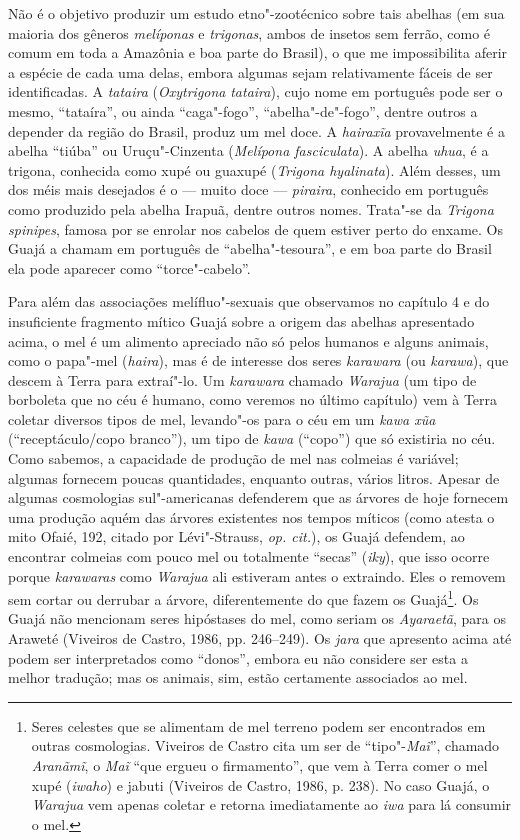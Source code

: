 Não é o objetivo produzir um estudo etno"-zootécnico sobre tais abelhas
(em sua maioria dos gêneros \emph{melíponas} e \emph{trigonas}, ambos de
insetos sem ferrão, como é comum em toda a Amazônia e boa parte do
Brasil), o que me impossibilita aferir a espécie de cada uma delas,
embora algumas sejam relativamente fáceis de ser identificadas. A
\emph{tataira} (\emph{Oxytrigona} \emph{tataira}), cujo nome em
português pode ser o mesmo, ``tataíra'', ou ainda ``caga"-fogo'',
``abelha"-de"-fogo'', dentre outros a depender da região do Brasil, produz
um mel doce. A \emph{hairaxĩa} provavelmente é a abelha ``tiúba'' ou
Uruçu"-Cinzenta (\emph{Melípona fasciculata}). A abelha \emph{uhua}, é a
trigona, conhecida como xupé ou guaxupé (\emph{Trigona hyalinata}). Além
desses, um dos méis mais desejados é o --- muito doce --- \emph{piraira},
conhecido em português como produzido pela abelha Irapuã, dentre outros
nomes. Trata"-se da \emph{Trigona spinipes}, famosa por se enrolar nos
cabelos de quem estiver perto do enxame. Os Guajá a chamam em português
de ``abelha"-tesoura'', e em boa parte do Brasil ela pode aparecer como
``torce"-cabelo''.

Para além das associações melífluo"-sexuais que observamos no capítulo 4
e do insuficiente fragmento mítico Guajá sobre a origem das abelhas
apresentado acima, o mel é um alimento apreciado não só pelos humanos e
alguns animais, como o papa"-mel (\emph{haira}), mas é de interesse dos
seres \emph{karawara} (ou \emph{karawa}), que descem à Terra para
extraí"-lo. Um \emph{karawara} chamado \emph{Warajua} (um tipo de
borboleta que no céu é humano, como veremos no último capítulo) vem à
Terra coletar diversos tipos de mel, levando"-os para o céu em um
\emph{kawa xũa} (``receptáculo/copo branco''), um tipo de \emph{kawa}
(``copo'') que só existiria no céu. Como sabemos, a capacidade de produção
de mel nas colmeias é variável; algumas fornecem poucas quantidades,
enquanto outras, vários litros. Apesar de algumas cosmologias
sul"-americanas defenderem que as árvores de hoje fornecem uma produção
aquém das árvores existentes nos tempos míticos (como atesta o mito
Ofaié, 192, citado por Lévi"-Strauss, \emph{op. cit.}), os Guajá defendem, ao
encontrar colmeias com pouco mel ou totalmente ``secas'' (\emph{iky}),
que isso ocorre porque \emph{karawaras} como \emph{Warajua} ali
estiveram antes o extraindo. Eles o removem sem cortar ou derrubar a
árvore, diferentemente do que fazem os Guajá\footnote{Seres celestes que
  se alimentam de mel terreno podem ser encontrados em outras
  cosmologias. Viveiros de Castro cita um ser de ``tipo"-\emph{Maĩ}'',
  chamado \emph{Aranãmĩ}, o \emph{Maĩ} ``que ergueu o firmamento'', que
  vem à Terra comer o mel xupé (\emph{iwaho}) e jabuti (Viveiros de
  Castro, 1986, p. 238). No caso Guajá, o \emph{Warajua} vem apenas coletar
  e retorna imediatamente ao \emph{iwa} para lá consumir o mel.}. Os
Guajá não mencionam seres hipóstases do mel, como seriam os
\emph{Ayaraetã}, para os Araweté (Viveiros de Castro, 1986, pp. 246--249).
Os \emph{jara} que apresento acima até podem ser interpretados como
``donos'', embora eu não considere ser esta a melhor tradução; mas os
animais, sim, estão certamente associados ao mel.

